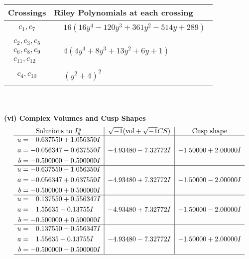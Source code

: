 \documentclass[1p]{elsarticle_modified}
\theoremstyle{definition}
\newcommand{\I}{\sqrt{-1}}
\begin{document}
\begin{tabular}{m{50pt}|m{274pt}}
Crossings & \hspace{64pt}Riley Polynomials at each crossing \\
\hline $$\begin{aligned}c_{1},c_{7}\end{aligned}$$&$\begin{aligned}
&16(16 y^4-120 y^3+361 y^2-514 y+289)
\end{aligned}$\\
\hline $$\begin{aligned}c_{2},c_{3},c_{5}\\c_{6},c_{8},c_{9}\\c_{11},c_{12}\end{aligned}$$&$\begin{aligned}
&4(4 y^4+8 y^3+13 y^2+6 y+1)
\end{aligned}$\\
\hline $$\begin{aligned}c_{4},c_{10}\end{aligned}$$&$\begin{aligned}
&(y^2+4)^2
\end{aligned}$\\
\hline
\end{tabular}\\~\\
\newpage\flushleft \textbf{(vi) Complex Volumes and Cusp Shapes}
$$\begin{array}{c|c|c}  
\text{Solutions to }I^u_{9}& \I (\text{vol} + \sqrt{-1}CS) & \text{Cusp shape}\\
 \hline 
\begin{aligned}
u &= -0.637550 + 1.056350 I \\
a &= -0.056347 - 0.637550 I \\
b &= -0.500000 - 0.500000 I\end{aligned}
 & -4.93480 - 7.32772 I & -1.50000 + 2.00000 I \\ \hline\begin{aligned}
u &= -0.637550 - 1.056350 I \\
a &= -0.056347 + 0.637550 I \\
b &= -0.500000 + 0.500000 I\end{aligned}
 & -4.93480 + 7.32772 I & -1.50000 - 2.00000 I \\ \hline\begin{aligned}
u &= \phantom{-}0.137550 + 0.556347 I \\
a &= \phantom{-}1.55635 - 0.13755 I \\
b &= -0.500000 + 0.500000 I\end{aligned}
 & -4.93480 + 7.32772 I & -1.50000 - 2.00000 I \\ \hline\begin{aligned}
u &= \phantom{-}0.137550 - 0.556347 I \\
a &= \phantom{-}1.55635 + 0.13755 I \\
b &= -0.500000 - 0.500000 I\end{aligned}
 & -4.93480 - 7.32772 I & -1.50000 + 2.00000 I\\
 \hline 
 \end{array}$$\newpage\newpage\renewcommand{\arraystretch}{1}
\end{document}
